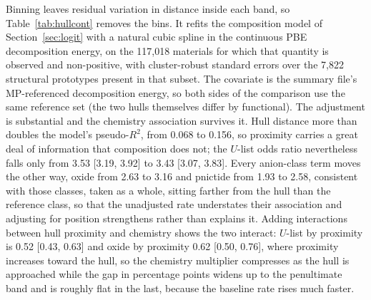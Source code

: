 \documentclass[11pt]{article}
\begin{document}
Binning leaves residual variation in distance inside each band, so Table~\ref{tab:hullcont}
removes the bins. It refits the composition model of Section~\ref{sec:logit} with a
natural cubic spline in the continuous PBE decomposition energy, on the 117{,}018
materials for which that quantity is observed and non-positive, with cluster-robust
standard errors over the 7{,}822 structural prototypes present in that subset. The
covariate is the summary file's MP-referenced decomposition energy, so both sides of the
comparison use the same reference set (the two hulls themselves differ by functional). The adjustment is substantial and the chemistry
association survives it. Hull distance more than doubles the model's pseudo-$R^2$, from
0.068 to 0.156, so proximity carries a great deal of information that composition does
not; the $U$-list odds ratio nevertheless falls only from 3.53 [3.19, 3.92] to 3.43
[3.07, 3.83]. Every anion-class term moves the other way, oxide from 2.63 to 3.16 and pnictide from
1.93 to 2.58, consistent with those classes, taken as a whole, sitting farther from the hull than the reference
class, so that the unadjusted rate understates their association and
adjusting for position strengthens rather than explains it. Adding
interactions between hull proximity and chemistry shows the two interact:
$U$-list by proximity is 0.52 [0.43, 0.63] and oxide by proximity 0.62 [0.50, 0.76], where
proximity increases toward the hull, so the chemistry multiplier compresses as the hull is approached while
the gap in percentage points widens up to the penultimate band and is roughly flat in
the last, because the baseline rate rises much faster.
\end{document}
